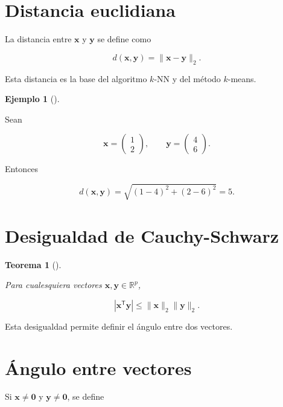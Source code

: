 \documentclass[
  spanish,
  11pt,
  letterpaper,
  DIV=11,
  numbers=noendperiod]{scrreprt}
\theoremstyle{definition}
\theoremstyle{plain}
\newtheorem{theorem}{Teorema}[chapter]
\theoremstyle{definition}
\newtheorem{example}{Ejemplo}[chapter]
\theoremstyle{remark}
\begin{document}
\section{Distancia euclidiana}\label{distancia-euclidiana}

La distancia entre \(\mathbf{x}\) y \(\mathbf{y}\) se define como

\[
d(\mathbf{x},\mathbf{y})
=
\|\mathbf{x}-\mathbf{y}\|_2.
\]

Esta distancia es la base del algoritmo \(k\)-NN y del método
\(k\)-means.

\begin{example}[]\protect\hypertarget{exm-distancia}{}\label{exm-distancia}

Sean

\[
\mathbf{x}
=
\begin{pmatrix}
1\\
2
\end{pmatrix},
\qquad
\mathbf{y}
=
\begin{pmatrix}
4\\
6
\end{pmatrix}.
\]

Entonces

\[
d(\mathbf{x},\mathbf{y})
=
\sqrt{(1-4)^2+(2-6)^2}
=
5.
\]

\end{example}

\section{Desigualdad de
Cauchy-Schwarz}\label{desigualdad-de-cauchy-schwarz}

\begin{theorem}[]\protect\hypertarget{thm-cauchy-schwarz}{}\label{thm-cauchy-schwarz}

Para cualesquiera vectores \(\mathbf{x},\mathbf{y}\in\mathbb{R}^{p}\),

\[
|\mathbf{x}^{\mathsf T}\mathbf{y}|
\leq
\|\mathbf{x}\|_2
\|\mathbf{y}\|_2.
\]

\end{theorem}

Esta desigualdad permite definir el ángulo entre dos vectores.

\section{Ángulo entre vectores}\label{uxe1ngulo-entre-vectores}

Si \(\mathbf{x}\neq\mathbf{0}\) y \(\mathbf{y}\neq\mathbf{0}\), se
define
\end{document}
